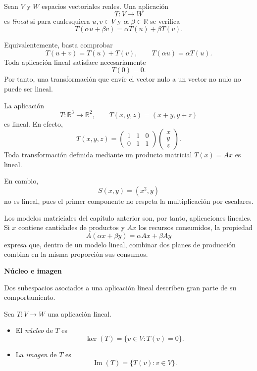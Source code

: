 \begin{definition}
Sean $V$ y $W$ espacios vectoriales reales. Una aplicación
\[
T:V\longrightarrow W
\]
es \emph{lineal} si para cualesquiera $u,v\in V$ y $\alpha,\beta\in\mathbb{R}$ se verifica
\[
T(\alpha u+\beta v)
=\alpha T(u)+\beta T(v).
\]
\end{definition}

Equivalentemente, basta comprobar
\[
T(u+v)=T(u)+T(v),
\qquad
T(\alpha u)=\alpha T(u).
\]
Toda aplicación lineal satisface necesariamente
\[
T(0)=0.
\]
Por tanto, una transformación que envíe el vector nulo a un vector no nulo no puede ser lineal.

\begin{example}
La aplicación
\[
T:\mathbb{R}^3\longrightarrow\mathbb{R}^2,
\qquad
T(x,y,z)=(x+y,y+z)
\]
es lineal. En efecto,
\[
T(x,y,z)
=
\begin{pmatrix}
1&1&0\\
0&1&1
\end{pmatrix}
\begin{pmatrix}x\\y\\z\end{pmatrix}.
\]
Toda transformación definida mediante un producto matricial $T(x)=Ax$ es lineal.

En cambio,
\[
S(x,y)=(x^2,y)
\]
no es lineal, pues el primer componente no respeta la multiplicación por escalares.
\end{example}

Los modelos matriciales del capítulo anterior son, por tanto, aplicaciones lineales. Si $x$ contiene cantidades de productos y $Ax$ los recursos consumidos, la propiedad
\[
A(\alpha x+\beta y)=\alpha Ax+\beta Ay
\]
expresa que, dentro de un modelo lineal, combinar dos planes de producción combina en la misma proporción sus consumos.

\textbf{Núcleo e imagen}

Dos subespacios asociados a una aplicación lineal describen gran parte de su comportamiento.

\begin{definition}
Sea $T:V\to W$ una aplicación lineal.
\begin{itemize}
\item El \emph{núcleo} de $T$ es
\[
\ker(T)=\{v\in V:T(v)=0\}.
\]
\item La \emph{imagen} de $T$ es
\[
\operatorname{Im}(T)=\{T(v):v\in V\}.
\]
\end{itemize}
\end{definition}


